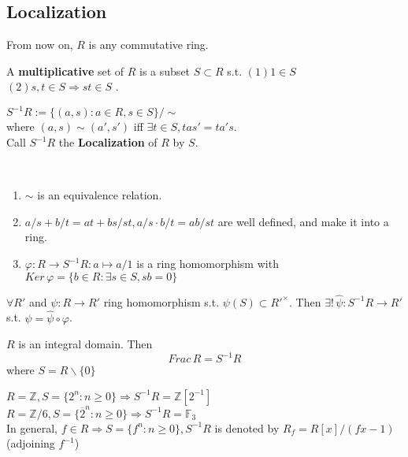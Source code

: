 \subsection{Localization}
From now on,  $ R  $ is any commutative ring.
\begin{definition}
    A \textbf{multiplicative} set of  $ R  $ is a subset  $ S\subset R  $ s.t.  $ (1)  1\in S $   $ (2)s,t\in S \Rightarrow st\in S $ .
\end{definition}
\begin{definition}
     $ S^{-1}R:=\{(a,s):a\in R,s\in S\}/\sim $\\
     where  $ (a,s)\sim(a',s') $ iff  $ \exists t\in S, tas'=ta's $.\\
     Call  $ S^{-1}R  $ the \textbf{Localization} of  $ R  $ by  $ S $.  
\end{definition}
\begin{lemma}
    \,
    \begin{enumerate}
        \item  $ \sim  $ is an equivalence relation.
        \item  $ a/s+b/t=at+bs/st,a/s\cdot b/t=ab/st $ are well defined, and make it into a ring.
        \item  $ \varphi :R\rightarrow S^{-1}R:a\mapsto a/1 $ is a ring homomorphism with  $ Ker\,\varphi=\{b\in R:\exists s\in S,sb=0\} $ 
    \end{enumerate}
\end{lemma}
\begin{theorem}[universality]
     $ \forall R' $ and  $ \psi:R\rightarrow R'  $ ring homomorphism s.t.  $ \psi(S)\subset R'^{\times } $. Then  $ \exists ! \,\widehat{\psi}:S^{-1}R\rightarrow R'  $ s.t.  $ \psi=\widehat{\psi}\circ \varphi $.   
\end{theorem}
\begin{example}
    $ R  $ is an integral domain. Then 
\[Frac\, R=S^{-1}R\]
where  $ S=R\backslash \{0\} $ 
\end{example}
\begin{example}
     $ R=\mathbb{Z},S=\{2^n:n \geq 0\}\Rightarrow S^{-1}R=\mathbb{Z}[2^{-1}] $\\
      $ R=\mathbb{Z}/6,S=\{\overline{2}^n:n \geq 0\}\Rightarrow S^{-1}R=\mathbb{F}_3 $\\
      In general,  $ f\in R \Rightarrow S=\{f^n:n \geq 0\}, S^{-1}R $ is denoted by  $ R_f=R[x]/(fx-1) $   (adjoining  $ f^{-1} $) 
\end{example}
